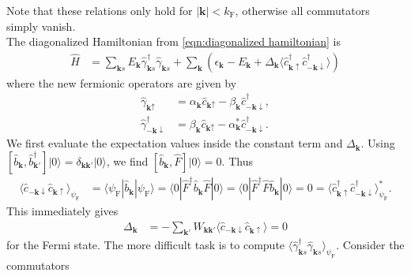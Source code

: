 \documentclass[english, parskip=full]{scrartcl}
\renewcommand{\bra}{}
\renewcommand{\braket}{}
\newcommand{\kla}{}
\newcommand{\klam}{}
\newcommand{\tecxt}{}
\newcommand{\Ket}{}
\begin{document}
Note that these relations only hold for $|\textbf{k}| < k_\tecxt\text{F}$, otherwise all commutators simply vanish.
\\
The diagonalized Hamiltonian from \autoref{eqn:diagonalized hamiltonian} is 
\begin{align}
\hat{H} &= \sum_{\mathbf{k}s} E_{\mathbf{k}} \hat{\gamma}_{\mathbf{k}s}^\dagger \hat{\gamma}_{\mathbf{k}s} + \sum_{\textbf{k}}\kla\left(  \epsilon_\textbf{k} - E_\textbf{k} + \Delta_\textbf{k} \langle \hat{c}_{\mathbf{k}\uparrow}^\dagger \hat{c}_{-\mathbf{k}\downarrow}^\dagger \rangle \right)
\end{align}
where the new fermionic operators are given by
\begin{align}
\hat{\gamma}_{\textbf{k}\uparrow} &= \alpha_\textbf{k} \hat{c}_{\textbf{k}\uparrow} - \beta_\textbf{k} \hat{c}_{-\textbf{k}\downarrow}^\dagger,\\
\hat{\gamma}_{-\textbf{k}\downarrow}^\dagger &= \beta_\textbf{k} \hat{c}_{\textbf{k}\uparrow} - \alpha^\ast_\textbf{k} \hat{c}_{-\textbf{k}\downarrow}^\dagger.
\end{align}
We first evaluate the expectation values inside the constant term and $\Delta_\textbf{k}$.
Using $\klam\left[ {\hat{b}_{\textbf{k}}, \hat{b}_{\textbf{k}'}^\dagger } \right] \Ket | {0} \rangle = \delta_{\textbf{k}\textbf{k}'} \Ket | {0} \rangle$, we find $\klam\left[ {\hat{b}_{\textbf{k}}, \hat{F}} \right] \Ket | {0} \rangle = 0$.
Thus
\begin{align}
\bra\langle \hat{c}_{-\mathbf{k}\downarrow} \hat{c}_{\mathbf{k}\uparrow} \rangle_{\psi_\tecxt\text{F}} &= \braket\langle \psi_\tecxt\text{F} | \hat{b}_{\mathbf{k}} | \psi_\tecxt\text{F} \rangle = \braket\langle 0 | \hat{F}^\dagger  \hat{b}_{\mathbf{k}} \hat{F} | 0 \rangle = \braket\langle 0 | \hat{F}^\dagger \hat{F} \hat{b}_{\textbf{k}} | 0\rangle = 0 = \bra\langle \hat{c}_{\mathbf{k}\uparrow}^\dagger \hat{c}_{-\mathbf{k}\downarrow}^\dagger \rangle_{\psi_\tecxt\text{F}}^\ast .
\end{align}
This immediately gives 
\begin{align}
\Delta_\textbf{k} &= -\sum_{\textbf{k}'} W_{\textbf{k}\textbf{k}'} \bra\langle  \hat{c}_{-\mathbf{k}\downarrow} \hat{c}_{\mathbf{k}\uparrow} \rangle = 0
\end{align}
for the Fermi state.
The more difficult task is to compute $\bra\langle \hat{\gamma}_{\mathbf{k}s}^\dagger \hat{\gamma}_{\mathbf{k}s} \rangle_{\psi_\tecxt\text{F}}$.
Consider the commutators
\end{document}
